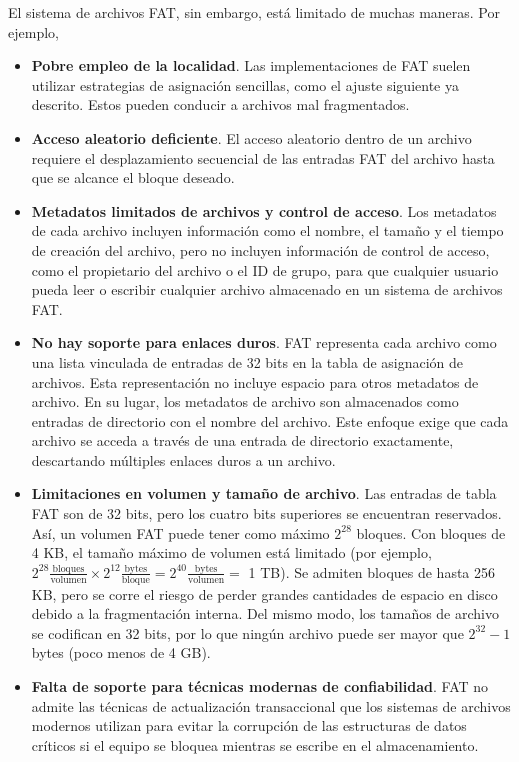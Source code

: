 \documentclass[10pt]{book}
\begin{document}
El sistema de archivos FAT, sin embargo, está limitado de muchas maneras. Por ejemplo,
\begin{itemize}
\item \textbf{Pobre empleo de la localidad}. Las implementaciones de FAT suelen utilizar estrategias de asignación sencillas, como el ajuste siguiente ya descrito. Estos pueden conducir a archivos mal fragmentados.
\item \textbf{Acceso aleatorio deficiente}. El acceso aleatorio dentro de un archivo requiere el desplazamiento secuencial de las entradas FAT del archivo hasta que se alcance el bloque deseado.
\item \textbf{Metadatos limitados de archivos y control de acceso}. Los metadatos de cada archivo incluyen información como el nombre, el tamaño y el tiempo de creación del archivo, pero no incluyen información de control de acceso, como el propietario del archivo o el ID de grupo, para que cualquier usuario pueda leer o escribir cualquier archivo almacenado en un sistema de archivos FAT.
\item \textbf{No hay soporte para enlaces duros}. FAT representa cada archivo como una lista vinculada de entradas de 32 bits en la tabla de asignación de archivos. Esta representación no incluye espacio para otros metadatos de archivo. En su lugar, los metadatos de archivo son almacenados como entradas de directorio con el nombre del archivo. Este enfoque exige que cada archivo se acceda a través de una entrada de directorio exactamente, descartando múltiples enlaces duros a un archivo.
\item \textbf{Limitaciones en volumen y tamaño de archivo}. Las entradas de tabla FAT son de 32 bits, pero los cuatro bits superiores se encuentran reservados. Así, un volumen FAT puede tener como máximo $2^{28}$ bloques. Con bloques de 4 KB, el tamaño máximo de volumen está limitado (por ejemplo, $2^{28} \frac{\text{bloques}}{\text{volumen}} \times 2^{12}\frac{\text{bytes}}{\text{bloque}} = 2^{40}\frac{\text{bytes}}{\text{volumen}} =$ 1 TB). Se admiten bloques de hasta 256 KB, pero se corre el riesgo de perder grandes cantidades de espacio en disco debido a la fragmentación interna. Del mismo modo, los tamaños de archivo se codifican en 32 bits, por lo que ningún archivo puede ser mayor que $2^{32} - 1$ bytes (poco menos de 4 GB).
\item \textbf{Falta de soporte para técnicas modernas de confiabilidad}. FAT no admite las técnicas de actualización transaccional que
los sistemas de archivos modernos utilizan para evitar la corrupción de las estructuras de datos críticos si el equipo se bloquea mientras se escribe en el almacenamiento.
\end{itemize}
\end{document}
